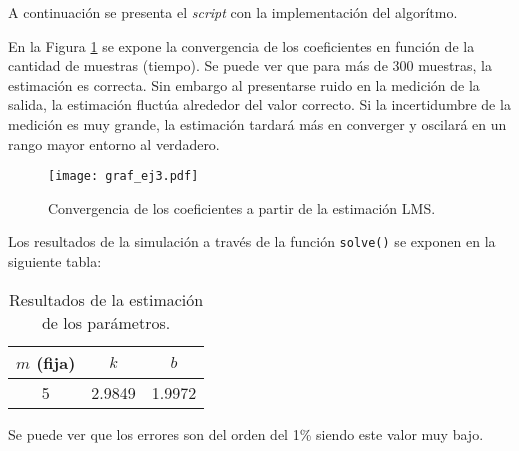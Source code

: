 	
	A continuación se presenta el \emph{script} con la implementación del algorítmo. 
	

	En la Figura \ref{fig:ej3} se expone la convergencia de los coeficientes en función de la cantidad de muestras (tiempo). Se puede ver que para más de 300 muestras, la estimación es correcta. Sin embargo al presentarse ruido en la medición de la salida, la estimación fluctúa alrededor del valor correcto. 
	Si la incertidumbre de la medición es muy grande, la estimación tardará más en converger y oscilará en un rango mayor entorno al verdadero.

	\begin{figure}[h!]
		\centering
		\texttt{[image: graf\_ej3.pdf]}
		\caption{Convergencia de los coeficientes a partir de la estimación LMS.}
		\label{fig:ej3}
	\end{figure}

	
	Los resultados de la simulación a través de la función \texttt{solve()} se exponen en la siguiente tabla: 

		\begin{table}[h!]
			\centering
			\begin{tabular}{ccc}
				\toprule
				$m$ (fija)	& $k$	& $b$\\
				\midrule
				5&\num{2.9849}&\num{1.9972}\\
				\bottomrule
			\end{tabular}
			\caption{Resultados de la estimación de los parámetros.}
			\label{tab:res_ej3}
		\end{table}

	Se puede ver que los errores son del orden del 1\% siendo este valor muy bajo.


